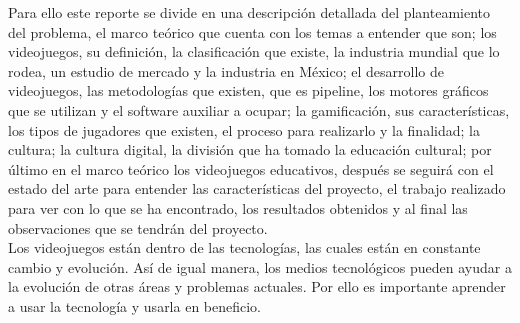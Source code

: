 Para ello este reporte se divide en una descripción detallada del planteamiento del problema, el marco teórico que cuenta con los temas a entender que son; los videojuegos, su definición, la clasificación que existe, la industria mundial que lo rodea, un estudio de mercado y la industria en México; el desarrollo de videojuegos, las metodologías que existen, que es pipeline, los motores gráficos que se utilizan y el software auxiliar a ocupar; la gamificación, sus características, los tipos de jugadores que existen, el proceso para realizarlo y la finalidad; la cultura; la cultura digital, la división que ha tomado la educación cultural; por último en el marco teórico los videojuegos educativos, después se seguirá con el estado del arte para entender las características del proyecto, el trabajo realizado para ver con lo que se ha encontrado, los resultados obtenidos y al final las observaciones que se tendrán del proyecto.
\\[1pt]

Los videojuegos están dentro de las tecnologías, las cuales están en constante cambio y evolución. Así de igual manera, los medios tecnológicos pueden ayudar a la evolución de otras áreas y problemas actuales. Por ello es importante aprender a usar la tecnología y usarla en beneficio.
\\[1pt]
